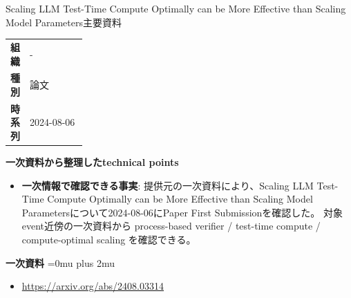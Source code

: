 \begin{technicalnote}{Scaling LLM Test-Time Compute Optimally can be More Effective than Scaling Model Parameters}{主要資料}
\begingroup
\begin{tabularx}{\linewidth}{@{}>{\bfseries}p{0.22\linewidth}X@{}}
組織 & - \\
種別 & 論文 \\
時系列 & 2024-08-06 \\
\end{tabularx}
\smallskip
{\bfseries 一次資料から整理したtechnical points}
\begin{itemize}[leftmargin=1.5em,itemsep=0.35em]
\item \textbf{一次情報で確認できる事実}: 提供元の一次資料により、Scaling LLM Test-Time Compute Optimally can be More Effective than Scaling Model Parametersについて2024-08-06にPaper First Submissionを確認した。 対象event近傍の一次資料から process-based verifier / test-time compute / compute-optimal scaling を確認できる。
\end{itemize}
\begin{minipage}{\linewidth}
\begin{samepage}
{\bfseries 一次資料}
\begingroup\sloppy
\Urlmuskip=0mu plus 2mu\relax
\begin{itemize}[leftmargin=1.5em,itemsep=0.25em]
\item {\scriptsize\url{https://arxiv.org/abs/2408.03314}}
\end{itemize}
\endgroup
\end{samepage}
\end{minipage}
\endgroup
\end{technicalnote}
\medskip


